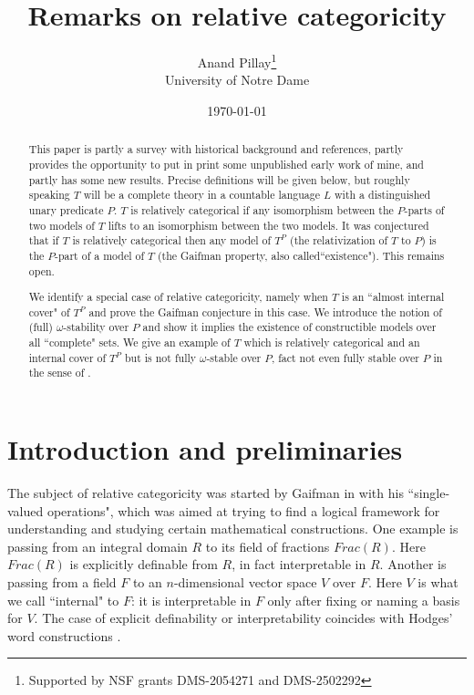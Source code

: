 \documentclass[12pt]{article}
\title{Remarks on relative categoricity}
\date{\today}
\author{Anand Pillay\thanks{Supported by NSF grants  DMS-2054271 and DMS-2502292}\\{University of Notre Dame}}
\begin{document}
\maketitle

\begin{abstract}  This paper is partly a survey with historical background and references, partly provides the opportunity to put in print some unpublished early work of mine, and partly has some new results. 
Precise definitions will be given below, but roughly speaking $T$ will be a complete theory in a countable language $L$  with a distinguished unary predicate $P$.  $T$ is relatively categorical if any isomorphism between the $P$-parts of two models of $T$ lifts to an isomorphism between the two models.  It was conjectured that if $T$ is relatively categorical then any model of $T^{P}$ (the relativization of $T$ to $P$) is the $P$-part of a model of $T$ (the Gaifman property, also called``existence").  This remains open.  

We identify a special case of relative categoricity, namely  when $T$ is an ``almost internal cover" of $T^{P}$ and prove the Gaifman conjecture in this case. We introduce the notion of (full) $\omega$-stability over $P$ and show it implies the existence of constructible models over all ``complete" sets. We give an example of $T$ which is relatively categorical and an  internal cover of $T^{P}$ but is not  fully $\omega$-stable over $P$, fact not even fully stable over $P$ in the sense of \cite{Usvyatsov}. 
\end{abstract}


\section{Introduction and preliminaries}
The subject of relative categoricity was started by Gaifman in \cite{Gaifman}  with his ``single-valued operations", which was aimed at trying to find a logical framework for understanding and studying 
certain mathematical constructions.  One example is passing from an integral domain $R$ to its field of fractions $Frac(R)$. Here $Frac(R)$ is explicitly definable from $R$, in fact interpretable in $R$.  Another is passing from a field $F$ to an $n$-dimensional 
vector space $V$ over $F$.  Here  $V$ is what we call ``internal" to $F$: it is interpretable in $F$ only after fixing or naming a basis for $V$.  The case of explicit definability or interpretability coincides with Hodges' word constructions \cite{Hodges-word}. 
\end{document}
